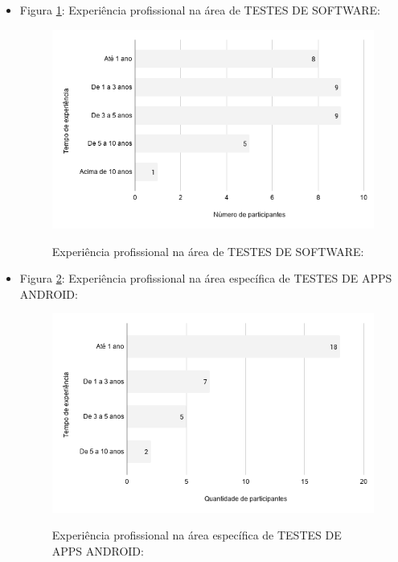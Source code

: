 \begin{itemize}
    \item Figura \ref{figure:s_experienciatestes}: Experiência profissional na área de TESTES DE SOFTWARE:
        \begin{figure}[!htb]
        \centering
        \includegraphics[width=.80\textwidth]{images/s_experienciatestes.png}
        \label{figure:s_experienciatestes}
        \caption{Experiência profissional na área de TESTES DE SOFTWARE:}
        \end{figure}
    

    \item Figura \ref{figure:s_experienciatestesandroid}: Experiência profissional na área específica de TESTES DE APPS ANDROID:
        \begin{figure}[!htb]
        \centering
        \includegraphics[width=.80\textwidth]{images/s_experienciatestesandroid.png}
        \label{figure:s_experienciatestesandroid}
        \caption{Experiência profissional na área específica de TESTES DE APPS ANDROID:}
        \end{figure}
    

\end{itemize}
